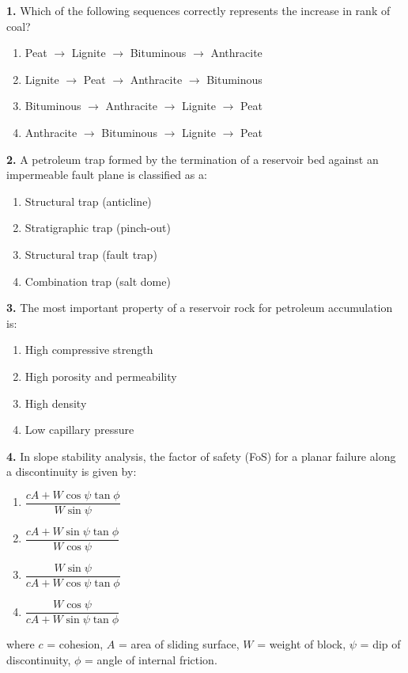 \documentclass[11pt]{article}
\begin{document}
\begin{exercice}
\textbf{1.} Which of the following sequences correctly represents the increase in rank of coal?
\begin{enumerate}[label=\Alph*.]
\item Peat $\rightarrow$ Lignite $\rightarrow$ Bituminous $\rightarrow$ Anthracite
\item Lignite $\rightarrow$ Peat $\rightarrow$ Anthracite $\rightarrow$ Bituminous
\item Bituminous $\rightarrow$ Anthracite $\rightarrow$ Lignite $\rightarrow$ Peat
\item Anthracite $\rightarrow$ Bituminous $\rightarrow$ Lignite $\rightarrow$ Peat
\end{enumerate}

\textbf{2.} A petroleum trap formed by the termination of a reservoir bed against an impermeable fault plane is classified as a:
\begin{enumerate}[label=\Alph*.]
\item Structural trap (anticline)
\item Stratigraphic trap (pinch-out)
\item Structural trap (fault trap)
\item Combination trap (salt dome)
\end{enumerate}

\textbf{3.} The most important property of a reservoir rock for petroleum accumulation is:
\begin{enumerate}[label=\Alph*.]
\item High compressive strength
\item High porosity and permeability
\item High density
\item Low capillary pressure
\end{enumerate}

\textbf{4.} In slope stability analysis, the factor of safety (FoS) for a planar failure along a discontinuity is given by:
\begin{enumerate}[label=\Alph*.]
\item $\dfrac{cA + W\cos\psi \tan\phi}{W\sin\psi}$
\item $\dfrac{cA + W\sin\psi \tan\phi}{W\cos\psi}$
\item $\dfrac{W\sin\psi}{cA + W\cos\psi \tan\phi}$
\item $\dfrac{W\cos\psi}{cA + W\sin\psi \tan\phi}$
\end{enumerate}
where $c$ = cohesion, $A$ = area of sliding surface, $W$ = weight of block, $\psi$ = dip of discontinuity, $\phi$ = angle of internal friction.
\end{exercice}
\end{document}
